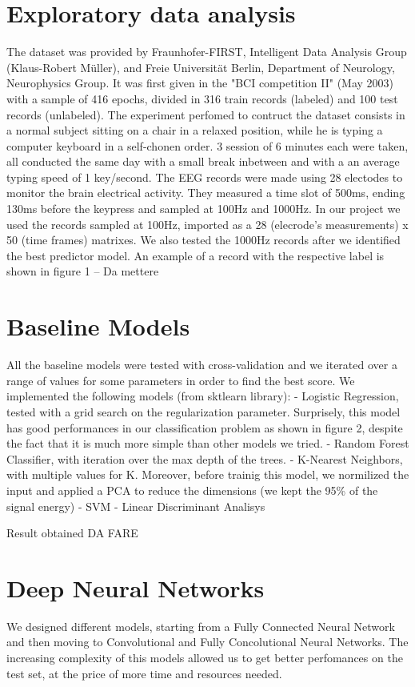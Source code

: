 \documentclass[10pt,conference,compsocconf]{IEEEtran}
\begin{document}
\section{Exploratory data analysis}
\label{sec:data-analysis}
The dataset was provided by Fraunhofer-FIRST, Intelligent Data Analysis Group (Klaus-Robert Müller), and Freie Universität Berlin, Department of Neurology, Neurophysics Group. It was first given in the "BCI competition II" (May 2003) with a sample of 416 epochs, divided in 316 train records (labeled) and 100 test records (unlabeled).
The experiment perfomed to contruct the dataset consists in a normal subject sitting on a chair in a relaxed position, while he is typing a computer keyboard in a self-chonen order. 3 session of 6 minutes each were taken, all conducted the same day with a small break inbetween and with a an average typing speed of 1 key/second. The EEG records were made using 28 electodes to monitor the brain electrical activity. They measured a time slot of 500ms, ending 130ms before the keypress and sampled at 100Hz and 1000Hz. 
In our project we used the records sampled at 100Hz, imported as a 28 (elecrode's measurements) x 50 (time frames) matrixes. We also tested the 1000Hz records after we identified the best predictor model.
An example of a record with the respective label is shown in figure 1 -- Da mettere


\section{Baseline Models}
\label{sec:baseline}
All the baseline models were tested with cross-validation and we iterated over a range of values for some parameters in order to find the best score.
We implemented the following models (from sktlearn library):
- Logistic Regression, tested with a grid search on the regularization parameter. Surprisely, this model has good performances in our classification problem as shown in figure 2, despite the fact that it is much more simple than other models we tried.
- Random Forest Classifier, with iteration over the max depth of the trees.
- K-Nearest Neighbors, with multiple values for K. Moreover, before trainig this model, we normilized the input and applied a PCA to reduce the dimensions (we kept the 95\% of the signal energy)
- SVM
- Linear Discriminant Analisys

Result obtained 
DA FARE

\section{Deep Neural Networks}
\label{sec:deep}
We designed different models, starting from a Fully Connected Neural Network and then moving to Convolutional and Fully Concolutional Neural Networks. The increasing complexity of this models allowed us to get better perfomances on the test set, at the price of more time and resources needed.
\end{document}
